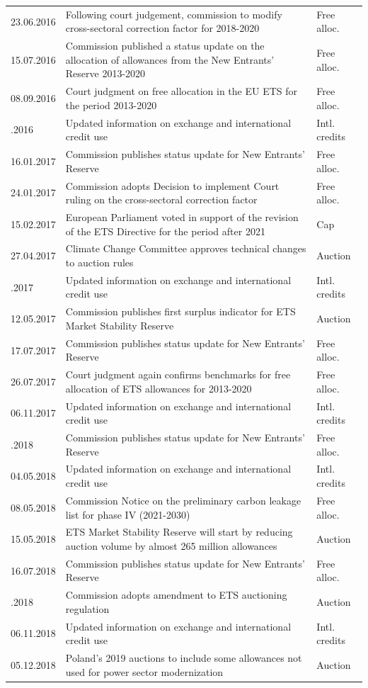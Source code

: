 \documentclass[
]{article}
\begin{document}
\begin{longtable}[l]{l>{\raggedright\arraybackslash}p{35em}l}
23.06.2016 & Following court judgement, commission to modify cross-sectoral correction factor for 2018-2020 & Free alloc.\\
15.07.2016 & Commission published a status update on the allocation of allowances from the New Entrants’ Reserve 2013-2020 & Free alloc.\\
08.09.2016 & Court judgment on free allocation in the EU ETS for the period 2013-2020 & Free alloc.\\
\addlinespace
04.11.2016 & Updated information on exchange and international credit use & Intl. credits\\
16.01.2017 & Commission publishes status update for New Entrants’ Reserve & Free alloc.\\
24.01.2017 & Commission adopts Decision to implement Court ruling on the cross-sectoral correction factor & Free alloc.\\
15.02.2017 & European Parliament voted in support of the revision of the ETS Directive for the period after 2021 & Cap\\
27.04.2017 & Climate Change Committee approves technical changes to auction rules & Auction\\
\addlinespace
02.05.2017 & Updated information on exchange and international credit use & Intl. credits\\
12.05.2017 & Commission publishes first surplus indicator for ETS Market Stability Reserve & Auction\\
17.07.2017 & Commission publishes status update for New Entrants’ Reserve & Free alloc.\\
26.07.2017 & Court judgment again confirms benchmarks for free allocation of ETS allowances for 2013-2020 & Free alloc.\\
06.11.2017 & Updated information on exchange and international credit use & Intl. credits\\
\addlinespace
15.01.2018 & Commission publishes status update for New Entrants’ Reserve & Free alloc.\\
04.05.2018 & Updated information on exchange and international credit use & Intl. credits\\
08.05.2018 & Commission Notice on the preliminary carbon leakage list for phase IV (2021-2030) & Free alloc.\\
15.05.2018 & ETS Market Stability Reserve will start by reducing auction volume by almost 265 million allowances & Auction\\
16.07.2018 & Commission publishes status update for New Entrants’ Reserve & Free alloc.\\
\addlinespace
30.10.2018 & Commission adopts amendment to ETS auctioning regulation & Auction\\
06.11.2018 & Updated information on exchange and international credit use & Intl. credits\\
05.12.2018 & Poland’s 2019 auctions to include some allowances not used for power sector modernization & Auction\\*
\end{longtable}
\endgroup{}
\end{document}
